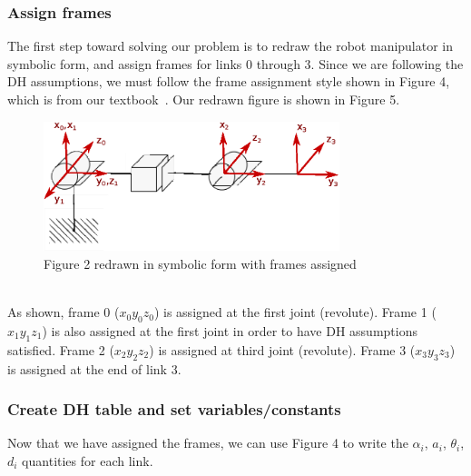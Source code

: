 \documentclass[conference]{IEEEtran}
\begin{document}
\subsubsection{Assign frames}
The first step toward solving our problem is to redraw the robot
manipulator in symbolic
form, and assign frames for links 0 through 3. Since we are following the DH assumptions,
we must follow the frame assignment style shown in Figure 4, which
is from our textbook~\cite{Spong2006}. Our redrawn figure is shown in Figure 5.\\
\begin{figure}[h]
    \centering
    \includegraphics[width=3.4in]{prob3_5_redraw}
    \caption{Figure 2 redrawn in symbolic form with frames assigned}
\end{figure}\\
As shown, frame 0 ($x_0 y_0 z_0$) is assigned at the first joint (revolute). Frame 1
($x_1 y_1 z_1$) is also assigned at the
first joint in order to have DH assumptions satisfied. Frame 2 ($x_2 y_2 z_2$)
 is assigned at third joint (revolute). Frame 3 ($x_3 y_3 z_3$) is assigned at
the end of link 3.\\

\subsubsection{Create DH table and set variables/constants}
Now that we have assigned the frames, we can use Figure 4 to write
the $\alpha_i$, $a_i$, $\theta_i$, $d_i$ quantities for each link.

\begin{table}[h!]
    \begin{center}
    \end{center}
    \caption{Denavit-Hartenberg table for Problem 3--5}
\end{table}
\end{document}
